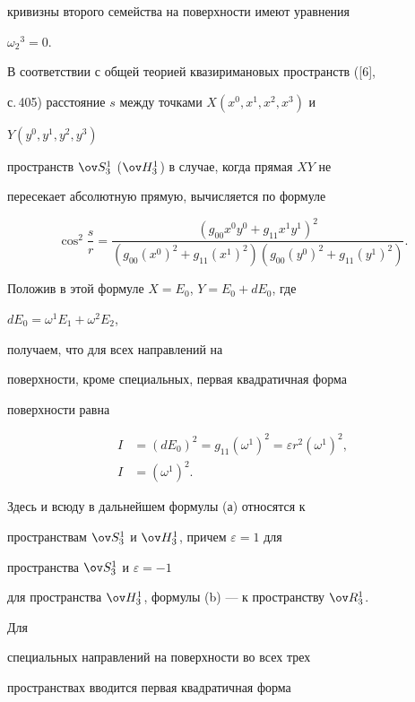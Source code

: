 кривизны второго семейства на поверхности имеют уравнения 


$\omega_2{}^3=0$.





В соответствии с общей теорией квазиримановых пространств ([6],


с.\,405) расстояние $s$ между точками $X(x^0,x^1,x^2,x^3)$ и 


$Y(y^0,y^1,y^2,y^3)$


пространств $\ov S^1_3$ ($\ov H^1_3$) в случае, когда прямая $XY$ не


пересекает абсолютную прямую, вычисляется по формуле


$$


\cos^2\frac{s}{r}=


\frac{(g_{00}x^0y^0+g_{11}x^1y^1)^2}


{(g_{00}(x^0)^2+g_{11}(x^1)^2)


(g_{00}(y^0)^2+g_{11}(y^1)^2)}.


$$


Положив в этой формуле $X=E_0$, $Y=E_0+dE_0$, где 


$dE_0=\omega^1E_1+\omega^2E_2$,


получаем, что для всех направлений на


поверхности, кроме специальных, первая квадратичная форма


поверхности равна


\begin{align}


I&=(dE_0)^2=g_{11}(\omega^1)^2=\varepsilon r^2


(\omega^1)^2, \tag{a} \\


I&=(\omega^1)^2.\tag{b}


\end{align}


Здесь и всюду в дальнейшем формулы (а) относятся к


пространствам $\ov S^1_3$ и $\ov H^1_3$, причем $\varepsilon{=}1$ для 


пространства $\ov S^1_3$ и $\varepsilon=-1$


для пространства $\ov H^1_3$, формулы (b) --- к пространству $\ov R^1_3$. 


Для


специальных направлений на поверхности во всех трех


пространствах вводится первая квадратичная форма


$$


